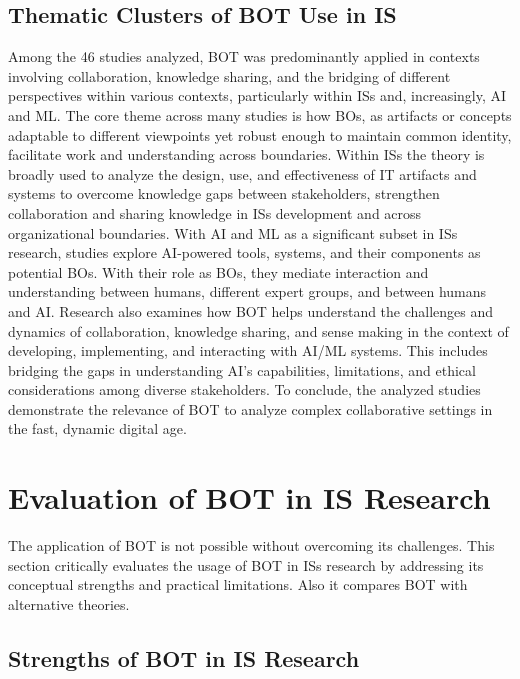 \documentclass[12pt,oneside]{article}
\begin{document}
\subsection{Thematic Clusters of BOT Use in IS} \label{thematic-clusters-bot-is}

Among the 46 studies analyzed, \ac{BOT} was predominantly applied in contexts involving collaboration, knowledge sharing, and the bridging of different perspectives within various contexts, particularly within \ac{IS}s and, increasingly, \ac{AI} and \ac{ML}. The core theme across many studies is how \ac{BO}s, as artifacts or concepts adaptable to different viewpoints yet robust enough to maintain common identity, facilitate work and understanding across boundaries. Within \ac{IS}s the theory is broadly used to analyze the design, use, and effectiveness of \ac{IT} artifacts and systems to overcome knowledge gaps between stakeholders, strengthen collaboration and sharing knowledge in \ac{IS}s development and across organizational boundaries. \newline
With \ac{AI} and \ac{ML} as a significant subset in \ac{IS}s research, studies explore \ac{AI}-powered tools, systems, and their components as potential \ac{BO}s. With their role as \ac{BO}s, they mediate interaction and understanding between humans, different expert groups, and between humans and \ac{AI}. Research also examines how \ac{BOT} helps understand the challenges and dynamics of collaboration, knowledge sharing, and sense making in the context of developing, implementing, and interacting with \ac{AI}/\ac{ML} systems. This includes bridging the gaps in understanding AI's capabilities, limitations, and ethical considerations among diverse stakeholders. To conclude, the analyzed studies demonstrate the relevance of \ac{BOT} to analyze complex collaborative settings in the fast, dynamic digital age.

\section{Evaluation of BOT in IS Research} \label{evaluation-of-bot-in-is-research}

The application of \ac{BOT} is not possible without overcoming its challenges. This section critically evaluates the usage of \ac{BOT} in \ac{IS}s research by addressing its conceptual strengths and practical limitations. Also it compares \ac{BOT} with alternative theories.

\subsection{Strengths of BOT in IS Research} \label{strengths-of-bot-in-is-research}
\end{document}
